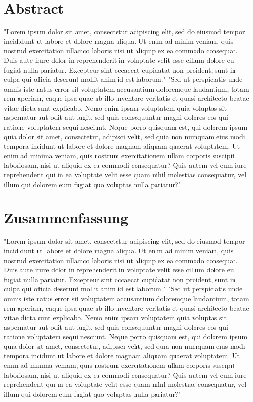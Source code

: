 \newpage
\thispagestyle{empty}
\mbox{}

\clearpage

\section*{Abstract}
\label{sec:abstract}
"Lorem ipsum dolor sit amet, consectetur adipiscing elit, sed do eiusmod tempor incididunt ut labore et dolore magna aliqua. Ut enim ad minim veniam, quis nostrud exercitation ullamco laboris nisi ut aliquip ex ea commodo consequat. Duis aute irure dolor in reprehenderit in voluptate velit esse cillum dolore eu fugiat nulla pariatur. Excepteur sint occaecat cupidatat non proident, sunt in culpa qui officia deserunt mollit anim id est laborum."
"Sed ut perspiciatis unde omnis iste natus error sit voluptatem accusantium doloremque laudantium, totam rem aperiam, eaque ipsa quae ab illo inventore veritatis et quasi architecto beatae vitae dicta sunt explicabo. Nemo enim ipsam voluptatem quia voluptas sit aspernatur aut odit aut fugit, sed quia consequuntur magni dolores eos qui ratione voluptatem sequi nesciunt. Neque porro quisquam est, qui dolorem ipsum quia dolor sit amet, consectetur, adipisci velit, sed quia non numquam eius modi tempora incidunt ut labore et dolore magnam aliquam quaerat voluptatem. Ut enim ad minima veniam, quis nostrum exercitationem ullam corporis suscipit laboriosam, nisi ut aliquid ex ea commodi consequatur? Quis autem vel eum iure reprehenderit qui in ea voluptate velit esse quam nihil molestiae consequatur, vel illum qui dolorem eum fugiat quo voluptas nulla pariatur?"

\section*{Zusammenfassung}
"Lorem ipsum dolor sit amet, consectetur adipiscing elit, sed do eiusmod tempor incididunt ut labore et dolore magna aliqua. Ut enim ad minim veniam, quis nostrud exercitation ullamco laboris nisi ut aliquip ex ea commodo consequat. Duis aute irure dolor in reprehenderit in voluptate velit esse cillum dolore eu fugiat nulla pariatur. Excepteur sint occaecat cupidatat non proident, sunt in culpa qui officia deserunt mollit anim id est laborum."
"Sed ut perspiciatis unde omnis iste natus error sit voluptatem accusantium doloremque laudantium, totam rem aperiam, eaque ipsa quae ab illo inventore veritatis et quasi architecto beatae vitae dicta sunt explicabo. Nemo enim ipsam voluptatem quia voluptas sit aspernatur aut odit aut fugit, sed quia consequuntur magni dolores eos qui ratione voluptatem sequi nesciunt. Neque porro quisquam est, qui dolorem ipsum quia dolor sit amet, consectetur, adipisci velit, sed quia non numquam eius modi tempora incidunt ut labore et dolore magnam aliquam quaerat voluptatem. Ut enim ad minima veniam, quis nostrum exercitationem ullam corporis suscipit laboriosam, nisi ut aliquid ex ea commodi consequatur? Quis autem vel eum iure reprehenderit qui in ea voluptate velit esse quam nihil molestiae consequatur, vel illum qui dolorem eum fugiat quo voluptas nulla pariatur?"
\clearpage

